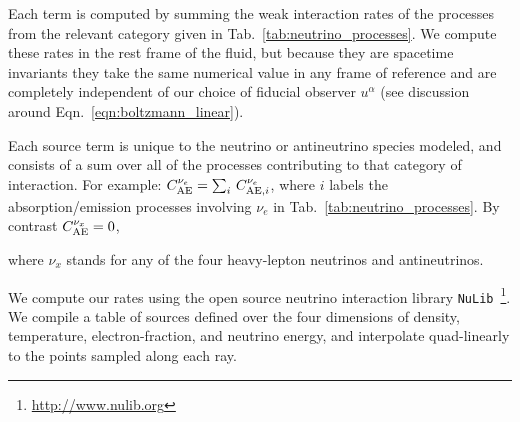 \documentclass[aps,floatfix,prd,superscriptaddress,twocolumn]{revtex4-1}
\newcommand{\todo}[1]{\marginpar{\tiny{\textcolor{red}{#1}}}}
\renewcommand\todo[1]{} %
\begin{document}
Each term
is computed by summing the weak interaction rates of the processes from the
relevant category given in Tab.~\ref{tab:neutrino_processes}.
We compute these rates in the rest frame of the fluid,
but because they are spacetime invariants
they take the same numerical value in any frame of reference
and are completely independent of our choice of fiducial observer $u^\alpha$
(see discussion around Eqn.~\ref{eqn:boltzmann_linear}).

Each source term is unique to the neutrino or antineutrino species modeled,
and consists of a sum over all of the processes contributing to that
category of interaction. For example:
$C^{\nu_e}_{{\rm AE}} = \sum_i\,C^{\nu_e}_{{\rm AE},i}$,
where $i$ labels the absorption/emission processes involving $\nu_e$
in Tab.~\ref{tab:neutrino_processes}.
By contrast $C^{\nu_x}_{{\rm AE}} = 0$,
\todo{but we use a nonzero $C^{\nu_x}_{{\rm AE}}$}
where $\nu_x$ stands for any of the four heavy-lepton neutrinos and
antineutrinos.

We compute our rates using the open source neutrino interaction
library \lstinline{NuLib}~\footnote{\url{http://www.nulib.org}}.
We compile a table of sources defined over the four dimensions of
density, temperature, electron-fraction, and neutrino energy, and
interpolate quad-linearly to the points sampled along each ray.
\end{document}
